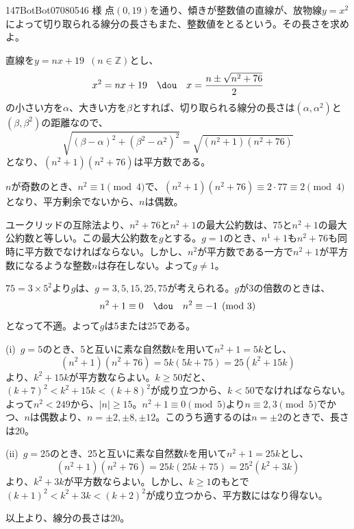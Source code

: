 \begin{prob}{147}{}{BotBot07080546 様}
 点$(0,19)$を通り、傾きが整数値の直線が、放物線$y=x^2$によって切り取られる線分の長さもまた、整数値をとるという。その長さを求めよ。
\end{prob}
直線を$y=nx+19$~$(n\in\mathbb{Z})$とし、
\[ x^2=nx+19 \quad\dou\quad x=\frac{n\pm\sqrt{n^2+76}}{2} \]
の小さい方を$\alpha$、大きい方を$\beta$とすれば、切り取られる線分の長さは$(\alpha, \alpha^2)$と$(\beta, \beta^2)$の距離なので、
\[ \sqrt{(\beta-\alpha)^2+(\beta^2-\alpha^2)^2} = \sqrt{(n^2+1)(n^2+76)} \]
となり、$(n^2+1)(n^2+76)$は平方数である。

$n$が奇数のとき、$n^2\equiv 1 \pmod{4}$で、$(n^2+1)(n^2+76)\equiv 2\cdot 77 \equiv 2 \pmod{4}$となり、平方剰余でないから、$n$は偶数。

ユークリッドの互除法より、$n^2+76$と$n^2+1$の最大公約数は、75と$n^2+1$の最大公約数と等しい。この最大公約数を$g$とする。$g=1$のとき、$n^1+1$も$n^2+76$も同時に平方数でなければならない。しかし、$n^2$が平方数である一方で$n^2+1$が平方数になるような整数$n$は存在しない。よって$g\neq 1$。

$75=3\times 5^2$より$g$は、$g=3, 5, 15, 25, 75$が考えられる。$g$が3の倍数のときは、
\[ n^2+1\equiv 0 \quad\dou\quad n^2\equiv -1 \pmod{3} \]
となって不適。よって$g$は5または25である。

(i)~$g=5$のとき、5と互いに素な自然数$k$を用いて$n^2+1=5k$とし、
\[ (n^2+1)(n^2+76)=5k(5k+75)=25(k^2+15k) \]
より、$k^2+15k$が平方数ならよい。$k\ge 50$だと、$(k+7)^2<k^2+15k<(k+8)^2$が成り立つから、$k<50$でなければならない。よって$n^2<249$から、$|n|\ge 15$。$n^2+1\equiv 0 \pmod{5}$より$n\equiv 2, 3 \pmod{5}$でかつ、$n$は偶数より、$n=\pm2, \pm8, \pm12$。このうち適するのは$n=\pm 2$のときで、長さは20。

(ii)~$g=25$のとき、25と互いに素な自然数$k$を用いて$n^2+1=25k$とし、
\[ (n^2+1)(n^2+76)=25k(25k+75)=25^2(k^2+3k) \]
より、$k^2+3k$が平方数ならよい。しかし、$k\ge 1$のもとで$(k+1)^2<k^2+3k<(k+2)^2$が成り立つから、平方数にはなり得ない。

以上より、線分の長さは20。